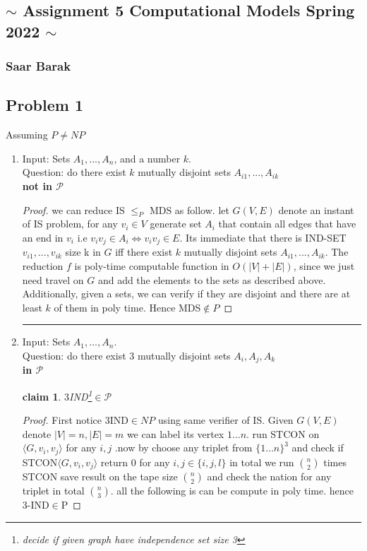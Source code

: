\documentclass[12pt]{article}
\newtheorem*{claim*}{claim}
\begin{document}
\begin{center}
\section*{$\sim$ Assignment 5  Computational Models Spring 2022 $\sim$}
\subsubsection*{Saar Barak}
\end{center}
\subsection*{Problem 1} 
Assuming $P\ne NP$
\begin{enumerate}[label=(\alph*)]
\item Input:  Sets $A_1, ..., A_n$, and a number $k$.\\ Question: do there exist $k$ mutually disjoint sets $A_{i1}
, ..., A_{ik}$\\
\textbf{ not in  $\mathcal{P}$}
\begin{proof}
we can reduce IS $ \le_P$ MDS as follow.  let $G(V,E)$ denote an instant of IS problem, for any $v_i\in V$ generate set $A_i$ that contain all edges that have an end in $v_i$  i.e $v_iv_j \in A_i \Leftrightarrow v_iv_j  \in E $. Its immediate that there is IND-SET  $v_{i1}
, ..., v_{ik}$ size k in $G$ iff  there exist $k$ mutually disjoint sets $A_{i1}, ..., A_{ik}$. The reduction $f$ is  poly-time computable function in  $O(|V|+|E|)$, since we just need travel on $G$ and add the elements  to the sets as described above. Additionally, given a 
sets, we can verify if they are disjoint and there are at least $k$ of them in poly
time. Hence MDS$\notin P$
\end{proof}
\hrule
\item Input:  Sets $A_1, ..., A_n$.\\ Question: do there exist 3 mutually disjoint sets $A_{i}
,A_{j}, A_{k}$\\
\textbf{ in  $\mathcal{P}$}
 
\begin{claim*} $3$IND\footnote{decide if given graph have independence set size 3}$\in \mathcal{P}$ 
\end{claim*}
\begin{proof}First notice 3IND$\in NP$ using same verifier of IS.
Given $G(V,E)$ denote $|V|=n,|E|=m$ we can label its vertex $1\dots n$. run STCON on $\langle G,v_i,v_j \rangle$ for any $i,j$
.now by choose  any triplet from $\{1\dots n\}^3$ and check if  STCON$\langle G,v_i,v_j \rangle$ return 0 for any $i,j\in \{i,j,l\}$ in total we run  $n \choose 2 $ times STCON save result on the tape size   $n \choose 2 $ and check the nation for any triplet in total $n \choose 3$. all the following is can be compute in poly time. hence 3-IND$ \in $P   


\end{proof}
\end{enumerate}
\end{document}

